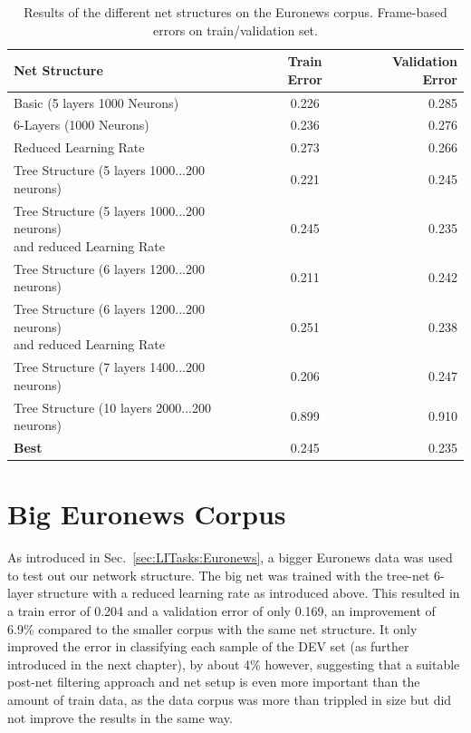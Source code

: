 \begin{table}[h!]
\centering
\caption{Results of the different net structures on the Euronews corpus. Frame-based errors on train/validation set.}
\label{tab:resFrameBased}
\begin{tabular}{| l | c | r | }
	\hline
	\textbf{Net Structure} & \textbf{Train Error} & \textbf{Validation Error}  \\
	\hline
	Basic (5 layers 1000 Neurons) & 0.226 &  0.285 \\
	\hline
	6-Layers (1000 Neurons) & 0.236 & 0.276 \\
	\hline
	Reduced Learning Rate & 0.273 & 0.266 \\ 
	\hline
	Tree Structure (5 layers 1000...200 neurons) & 0.221 & 0.245 \\
	\hline
	\parbox[t]{5cm}{Tree Structure (5 layers 1000...200 neurons)\\and reduced Learning Rate} & 0.245 & 0.235 \\
	\hline
	Tree Structure (6 layers 1200...200 neurons) & 0.211 & 0.242 \\
	\hline
	\parbox[t]{5cm}{Tree Structure (6 layers 1200...200 neurons) \\
	and reduced Learning Rate} & 0.251 & 0.238 \\
	\hline
	Tree Structure (7 layers 1400...200 neurons) & 0.206 & 0.247 \\
	\hline
	Tree Structure (10 layers 2000...200 neurons) & 0.899 & 0.910 \\
	\hline
	\textbf{Best} & 0.245 & 0.235 \\
	\hline
\end{tabular}
\end{table}

\section{Big Euronews Corpus}
\label{sec:IDNetworkBig}

As introduced in Sec.~\ref{sec:LITasks:Euronews}, a bigger Euronews data was used to test out our network structure. The big net was trained with the tree-net 6-layer structure with a reduced learning rate as introduced above. This resulted in a train error of 0.204 and a validation error of only 0.169, an improvement of 6.9\% compared to the smaller corpus with the same net structure. It only improved the error in classifying each sample of the DEV set (as further introduced in the next chapter), by about 4\% however, suggesting that a suitable post-net filtering approach and net setup is even more important than the amount of train data, as the data corpus was more than trippled in size but did not improve the results in the same way.

